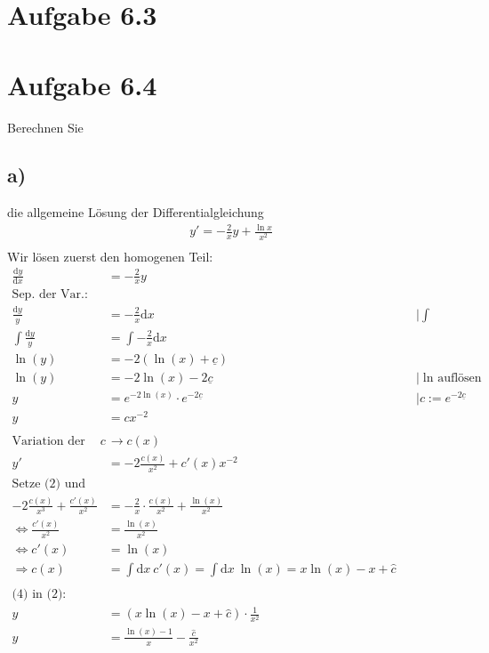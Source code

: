 \documentclass{theozettel}
\begin{document}
\section*{Aufgabe 6.3} 





\section*{Aufgabe 6.4} 
Berechnen Sie
\subsection*{a)}die allgemeine Lösung der Differentialgleichung
\begin{align*}
y'=-\frac{2}{x}y+\frac{\ln x}{x^2}\tag*{(1)}\\
\end{align*}
Wir lösen zuerst den homogenen Teil:
\begin{align*}
\frac{\text{d}y}{\text{d}x}&=-\frac{2}{x}y\\
\text{Sep. der Var.:}\\
\frac{\text{d}y}{y}&=-\frac{2}{x}\text{d}x&&|\int\\
\int\frac{\text{d}y}{y}&=\int-\frac{2}{x}\text{d}x\\
\ln\left(y\right)&=-2\left(\ln\left(x\right)+\underline{c}\right)\\
\ln\left(y\right)&=-2\ln\left(x\right)-2\underline{c}&&|\text{$\ln$ auflösen}\\
y&=e^{-2\ln\left(x\right)}\cdot e^{-2\underline{c}}&&|c:=e^{-2\underline{c}}\\
y&=cx^{-2}\tag*{(2)}\\\\
\text{Variation der Kons.:} \ c&\rightarrow c\left(x\right)\\
y'&=-2\frac{c\left(x\right)}{x^2}+c'\left(x\right)x^{-2}\tag*{(3)}\\
\text{Setze (2) und (3) in (1) ein:}\\
-2\frac{c\left(x\right)}{x^3}+\frac{c'\left(x\right)}{x^2}&=-\frac{2}{x}\cdot\frac{c\left(x\right)}{x^2}+\frac{\ln\left(x\right)}{x^2}\\
\Leftrightarrow \frac{c'\left(x\right)}{x^2}&=\frac{\ln\left(x\right)}{x^2}\\
\Leftrightarrow c'\left(x\right)&=\ln\left(x\right)\\
\Rightarrow c\left(x\right)&=\int\text{d}x \ c'\left(x\right) =\int\text{d}x \ \ln\left(x\right)=x\ln\left(x\right)-x+\hat{c} \tag*{(4)}\\\\
\text{(4) in (2):}\\
y&=\left(x\ln\left(x\right)-x+\hat{c}\right)\cdot \frac{1}{x^2}\\
y&=\frac{\ln\left(x\right)-1}{x}-\frac{\hat{c}}{x^2}
\end{align*}
\newpage
\end{document}
